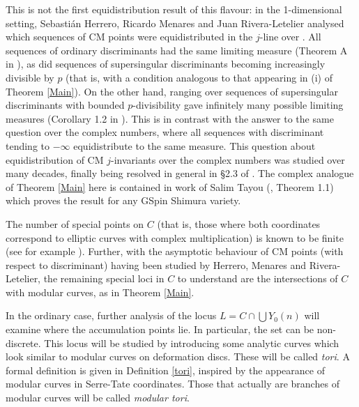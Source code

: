 \documentclass[12pt,letterpaper]{article}
\begin{document}
	This is not the first equidistribution result of this flavour: in the 1-dimensional setting, Sebasti\'an Herrero, Ricardo Menares and Juan Rivera-Letelier analysed which sequences of CM points were equidistributed in the $j$-line over \cp. All sequences of ordinary discriminants had the same limiting measure (Theorem A in \cite{HMR20}), as did sequences of supersingular discriminants becoming increasingly divisible by $p$ (that is, with a condition analogous to that appearing in (i) of Theorem \ref{Main}). On the other hand, ranging over sequences of supersingular discriminants with bounded $p$-divisibility gave infinitely many possible limiting measures (Corollary 1.2 in \cite{HMR21}). This is in contrast with the answer to the same question over the complex numbers, where all sequences with discriminant tending to $-\infty$ equidistribute to the same measure. This question about equidistribution of CM $j$-invariants over the complex numbers was studied over many decades, finally being resolved in general in \S2.3 of \cite{CU04}. The complex analogue of Theorem \ref{Main} here is contained in work of Salim Tayou (\cite{Tay20}, Theorem 1.1) which proves the result for any GSpin Shimura variety.


	The number of special points on $C$ (that is, those where both coordinates correspond to elliptic curves with complex multiplication) is known to be finite (see for example \cite{And98}). Further, with the asymptotic behaviour of CM points (with respect to discriminant) having been studied by Herrero, Menares and Rivera-Letelier, the remaining special loci in $C$ to understand are the intersections of $C$ with modular curves, as in Theorem \ref{Main}.

	
	In the ordinary case, further analysis of the locus $L=C\cap \bigcup Y_0(n)$ will examine where the accumulation points lie. In particular, the set can be non-discrete. This locus will be studied by introducing some analytic curves which look similar to modular curves on deformation discs. These will be called \textit{tori}. A formal definition is given in Definition \ref{tori}, inspired by the appearance of modular curves in Serre-Tate coordinates. Those that actually are branches of modular curves will be called \textit{modular tori}.
	
\end{document}
